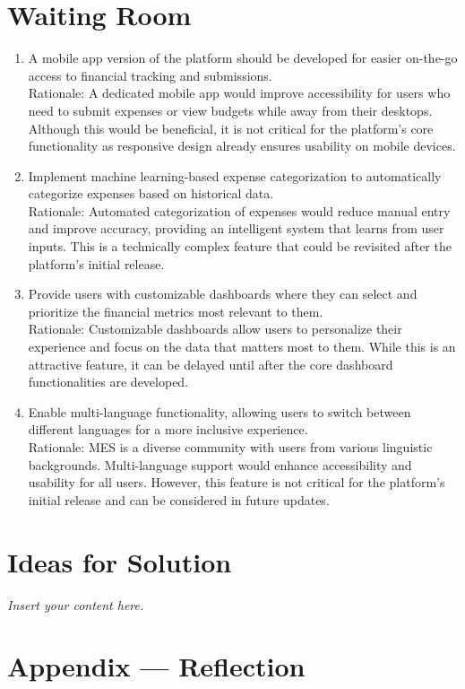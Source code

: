\documentclass[12pt]{article}
\newcommand{\lips}{\textit{Insert your content here.}}
\begin{document}
\section{Waiting Room}
\begin{enumerate}
  \item A mobile app version of the platform should be developed for easier on-the-go access to financial tracking and submissions. \\
  Rationale: A dedicated mobile app would improve accessibility for users who need to submit expenses or view budgets while away from their desktops. Although this would be beneficial, it is not critical for the platform’s core functionality as responsive design already ensures usability on mobile devices.
  \item Implement machine learning-based expense categorization to automatically categorize expenses based on historical data. \\
  Rationale: Automated categorization of expenses would reduce manual entry and improve accuracy, providing an intelligent system that learns from user inputs. This is a technically complex feature that could be revisited after the platform's initial release.
  \item Provide users with customizable dashboards where they can select and prioritize the financial metrics most relevant to them. \\
  Rationale: Customizable dashboards allow users to personalize their experience and focus on the data that matters most to them. While this is an attractive feature, it can be delayed until after the core dashboard functionalities are developed.
  \item Enable multi-language functionality, allowing users to switch between different languages for a more inclusive experience. \\
  Rationale: MES is a diverse community with users from various linguistic backgrounds. Multi-language support would enhance accessibility and usability for all users. However, this feature is not critical for the platform's initial release and can be considered in future updates.
\end{enumerate}

\section{Ideas for Solution}
\lips

\newpage{}
\section*{Appendix --- Reflection}
\end{document}
